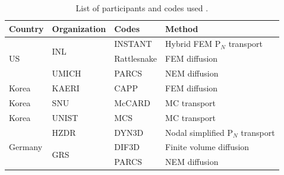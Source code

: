 \documentclass{anstrans}
\begin{document}
    \begin{table}[htbp!]
        \centering
        \caption{List of participants and codes used \cite{oecd_nea_coupled_2019}.}
        \label{tab:participants}
        \begin{tabular}{llll}
        \hline
        Country     & Organization  & Codes       & Method                           \\ \hline
        \multirow{ 3}{*}{\gls{US}}     & \multirow{ 2}{*}{\gls{INL}}      & INSTANT     & Hybrid \gls{FEM} P$_N$ transport \\
                    &               & Rattlesnake & \gls{FEM} diffusion              \\
                    & \gls{UMICH}   & PARCS       & \gls{NEM} diffusion              \\
        Korea       & \gls{KAERI}   & CAPP        & \gls{FEM} diffusion              \\
        Korea       & \gls{SNU}     & McCARD      & \gls{MC} transport               \\
        Korea       & \gls{UNIST}   & MCS         & \gls{MC} transport               \\
        \multirow{ 3}{*}{Germany}   & \gls{HZDR}    & DYN3D       & Nodal simplified P$_N$ transport \\
                    & \multirow{ 2}{*}{\gls{GRS}}   & DIF3D       & Finite volume diffusion          \\
                    &               & PARCS       & \gls{NEM} diffusion              \\ \hline
        \end{tabular}
    \end{table}
\end{document}
